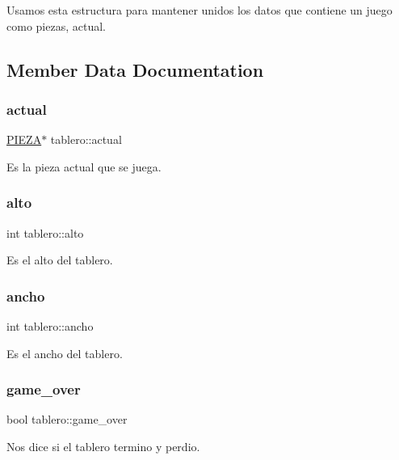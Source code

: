 Usamos esta estructura para mantener unidos los datos que contiene un juego como piezas, actual. 

\subsection{Member Data Documentation}
\mbox{\label{structtablero_a337ac84c79ee614ce0477c8996991a4c}} 
\subsubsection{\texorpdfstring{actual}{actual}}
{\footnotesize\ttfamily \hyperlink{pieza_8h_aac4b603fd85c8ae53529fc00a88de8ae}{P\+I\+E\+ZA}$\ast$ tablero\+::actual}

Es la pieza actual que se juega. \mbox{\label{structtablero_a02dc616234909717fced91fc61e374d1}} 
\subsubsection{\texorpdfstring{alto}{alto}}
{\footnotesize\ttfamily int tablero\+::alto}

Es el alto del tablero. \mbox{\label{structtablero_a7080955f58062103097ff1278118634c}} 
\subsubsection{\texorpdfstring{ancho}{ancho}}
{\footnotesize\ttfamily int tablero\+::ancho}

Es el ancho del tablero. \mbox{\label{structtablero_a227632399d4dce805bc16668cb1d72ea}} 
\subsubsection{\texorpdfstring{game\+\_\+over}{game\_over}}
{\footnotesize\ttfamily bool tablero\+::game\+\_\+over}

Nos dice si el tablero termino y perdio. \mbox{\label{structtablero_a9c533b92c8f862bf921f4d1011f01599}} 
